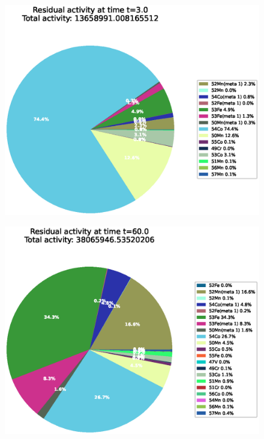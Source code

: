 \begin{figure}[!htb]
\centering
\includegraphics[width=0.8\linewidth]{chapters/results_activity_code/fe-activity-v2/residual-activity/0001_3.eps}
\caption{}
\label{fig:activity-v2-residual-activity-3s}
\end{figure}

\begin{figure}[!htb]
\centering
\includegraphics[width=0.8\linewidth]{chapters/results_activity_code/fe-activity-v2/residual-activity/0020_60.eps}
\caption{}
\label{fig:activity-v2-residual-activity-60s}
\end{figure}

